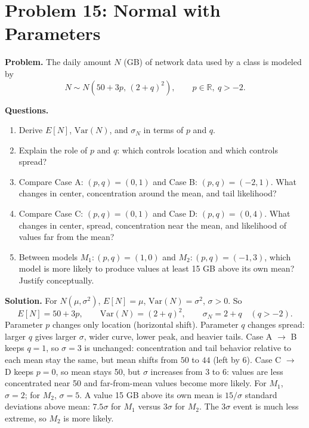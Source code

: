 \section{Problem 15: Normal with Parameters}

\textbf{Problem.}
The daily amount \(N\) (GB) of network data used by a class is modeled by
\[
N\sim N\!\left(50+3p,\,(2+q)^2\right),\qquad p\in\mathbb{R},\ q>-2.
\]

\textbf{Questions.}
\begin{enumerate}
  \item Derive \(E[N]\), \(\mathrm{Var}(N)\), and \(\sigma_N\) in terms of \(p\) and \(q\).
  \item Explain the role of \(p\) and \(q\): which controls location and which controls spread?
  \item Compare Case A: \((p,q)=(0,1)\) and Case B: \((p,q)=(-2,1)\). What changes in center, concentration around the mean, and tail likelihood?
  \item Compare Case C: \((p,q)=(0,1)\) and Case D: \((p,q)=(0,4)\). What changes in center, spread, concentration near the mean, and likelihood of values far from the mean?
  \item Between models \(M_1:(p,q)=(1,0)\) and \(M_2:(p,q)=(-1,3)\), which model is more likely to produce values at least 15 GB above its own mean? Justify conceptually.
\end{enumerate}

\textbf{Solution.}
For \(N(\mu,\sigma^2)\), \(E[N]=\mu\), \(\mathrm{Var}(N)=\sigma^2\), \(\sigma>0\).
So
\[
E[N]=50+3p,\qquad
\mathrm{Var}(N)=(2+q)^2,\qquad
\sigma_N=2+q \quad (q>-2).
\]
Parameter \(p\) changes only location (horizontal shift). Parameter \(q\) changes spread: larger \(q\) gives larger \(\sigma\), wider curve, lower peak, and heavier tails.
Case A \(\to\) B keeps \(q=1\), so \(\sigma=3\) is unchanged: concentration and tail behavior relative to each mean stay the same, but mean shifts from \(50\) to \(44\) (left by 6).
Case C \(\to\) D keeps \(p=0\), so mean stays 50, but \(\sigma\) increases from \(3\) to \(6\): values are less concentrated near 50 and far-from-mean values become more likely.
For \(M_1\), \(\sigma=2\); for \(M_2\), \(\sigma=5\). A value 15 GB above its own mean is \(15/\sigma\) standard deviations above mean: \(7.5\sigma\) for \(M_1\) versus \(3\sigma\) for \(M_2\). The \(3\sigma\) event is much less extreme, so \(M_2\) is more likely.
\begin{center}
\end{center}


